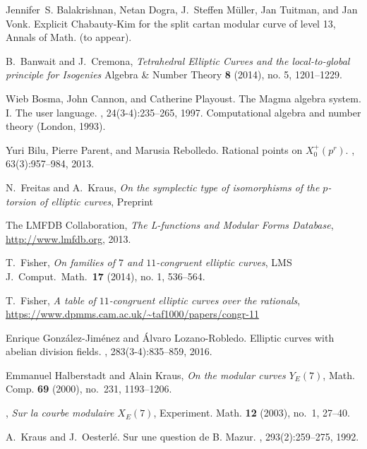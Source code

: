 \documentclass[12pt]{amsart}
\numberwithin{equation}{section}
\theoremstyle{definition}
\theoremstyle{remark}
\begin{document}
 
\begin{thebibliography}{999}

Jennifer~S. Balakrishnan, Netan Dogra, J.~Steffen M\"uller, Jan Tuitman, and
  Jan Vonk.
\newblock Explicit {C}habauty-{K}im for the split cartan modular curve of level 13, Annals of Math. (to appear).

 B.\ Banwait and J.\ Cremona, 
{\em Tetrahedral Elliptic Curves and the local-to-global principle for Isogenies}
Algebra \& Number Theory {\bf 8} (2014), no. 5, 1201--1229.

Wieb Bosma, John Cannon, and Catherine Playoust.
\newblock The {M}agma algebra system. {I}. {T}he user language.
, 24(3-4):235--265, 1997.
\newblock Computational algebra and number theory (London, 1993).

Yuri Bilu, Pierre Parent, and Marusia Rebolledo.
\newblock Rational points on {$X^+_0(p^r)$}.
, 63(3):957--984, 2013.

 N.\ Freitas and A.\ Kraus,
{\em On the symplectic type of isomorphisms of the $p$-torsion of elliptic curves}, Preprint

 The {LMFDB Collaboration},
{\em The L-functions and Modular Forms Database}, \\
\url{http://www.lmfdb.org}, 2013.

 T.\ Fisher,
{\em On families of $7$ and $11$-congruent elliptic curves}, 
LMS J.\ Comput.\ Math.\ {\bf 17} (2014), no. 1, 536--564.

 T.\ Fisher,
{\em A table of $11$-congruent elliptic curves over the rationals}, \\
\url{https://www.dpmms.cam.ac.uk/~taf1000/papers/congr-11}

Enrique Gonz\'{a}lez-Jim\'{e}nez and \'{A}lvaro Lozano-Robledo.
\newblock Elliptic curves with abelian division fields.
, 283(3-4):835--859, 2016.

Emmanuel Halberstadt and Alain Kraus, \emph{On the modular curves {$Y_E(7)$}},
  Math. Comp. \textbf{69} (2000), no.~231, 1193--1206. 

\bysame, \emph{Sur la courbe modulaire {$X_E(7)$}}, Experiment. Math.
  \textbf{12} (2003), no.~1, 27--40. 
  
A.~Kraus and J.~Oesterl\'{e}.
\newblock Sur une question de {B}. {M}azur.
, 293(2):259--275, 1992.



\end{thebibliography}
\end{document}
